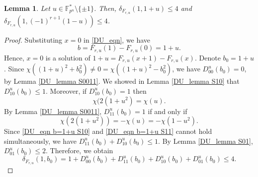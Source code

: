 \documentclass[11pt]{article}
\numberwithin{theorem}{section}
\newtheorem{lemma}[theorem]{Lemma}
\newcommand{\Fpnmul}{\mathbb{F}_{p^n}^*}
\begin{document}
\begin{lemma}\label{DU_lemma x=0, x=-1}
	Let $u\in \Fpnmul\setminus\{\pm1\}$. Then, $\delta_{F_{r,u}}(1,1+u)\le 4$ and $\delta_{F_{r,u}}(1,(-1)^{r+1}(1-u))\le 4$.
\end{lemma}

\begin{proof}
	Substituting $x=0$ in \eqref{DU_eqn}, we have
	\begin{equation*}
		b=F_{r,u}(1)-F_{r,u}(0) = 1+u.
	\end{equation*}
	Hence, $x=0$ is a solution of $1+u=F_{r,u}(x+1)-F_{r,u}(x)$. Denote $b_0=1+u$.	Since $\chi((1+u)^2+b_0^2)\ne 0 =\chi((1+u)^2-b_0^2)$, we have $D_{00}^u(b_0)=0$, by Lemma \ref{DU_lemma S0011}. 
	We showed in Lemma \ref{DU_lemma S10} that $D_{10}^u(b_0) \le 1$. Moreover, if $D_{10}^u(b_0)=1$ then
	\begin{equation}\label{DU_eqn b=1+u S10}
		\chi(2(1+u^2)=\chi(u).
	\end{equation}
	By Lemma \ref{DU_lemma S0011}, $D_{11}^u(b_0)=1$ if and only if 
	\begin{equation}\label{DU_eqn b=1+u S11}
		\chi(2(1+u^2))=-\chi(u)=-\chi(1-u^2).
	\end{equation}
	Since \eqref{DU_eqn b=1+u S10} and \eqref{DU_eqn b=1+u S11} cannot hold simultaneously, we have $D_{11}^u(b_0)+D_{10}^u(b_0)\le 1$. By Lemma \ref{DU_lemma S01}, $D_{01}^u(b_0) \le 2$. Therefore, we obtain
	\begin{equation*}
		\delta_{F_{r,u}}(1,b_0)=1+D_{00}^u(b_0)+D_{11}^u(b_0)+D_{10}^u(b_0)+D_{01}^u(b_0)\le 4.
	\end{equation*}
	 	

\end{proof}
\end{document}
